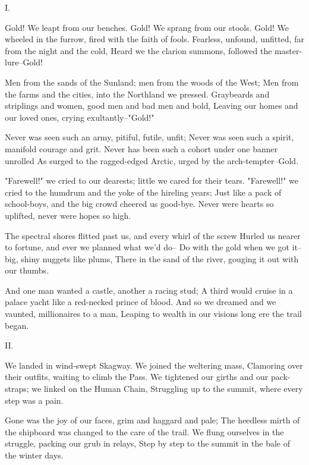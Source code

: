 
\begin{poemblock}
 I.

 Gold!  We leapt from our benches.  Gold!  We sprang from our stools.
 Gold!  We wheeled in the furrow, fired with the faith of fools.
 Fearless, unfound, unfitted, far from the night and the cold,
 Heard we the clarion summons, followed the master-lure--Gold!

 Men from the sands of the Sunland; men from the woods of the West;
 Men from the farms and the cities, into the Northland we pressed.
 Graybeards and striplings and women, good men and bad men and bold,
 Leaving our homes and our loved ones, crying exultantly--"Gold!"

 Never was seen such an army, pitiful, futile, unfit;
 Never was seen such a spirit, manifold courage and grit.
 Never has been such a cohort under one banner unrolled
 As surged to the ragged-edged Arctic, urged by the arch-tempter--Gold.

 "Farewell!" we cried to our dearests; little we cared for their tears.
 "Farewell!" we cried to the humdrum and the yoke of the hireling years;
 Just like a pack of school-boys, and the big crowd cheered us good-bye.
 Never were hearts so uplifted, never were hopes so high.

 The spectral shores flitted past us, and every whirl of the screw
 Hurled us nearer to fortune, and ever we planned what we'd do--
 Do with the gold when we got it--big, shiny nuggets like plums,
 There in the sand of the river, gouging it out with our thumbs.

 And one man wanted a castle, another a racing stud;
 A third would cruise in a palace yacht like a red-necked prince of blood.
 And so we dreamed and we vaunted, millionaires to a man,
 Leaping to wealth in our visions long ere the trail began.


 II.

 We landed in wind-swept Skagway.  We joined the weltering mass,
 Clamoring over their outfits, waiting to climb the Pass.
 We tightened our girths and our pack-straps; we linked on the Human Chain,
 Struggling up to the summit, where every step was a pain.

 Gone was the joy of our faces, grim and haggard and pale;
 The heedless mirth of the shipboard was changed to the care of the trail.
 We flung ourselves in the struggle, packing our grub in relays,
 Step by step to the summit in the bale of the winter days.


\end{poemblock}
